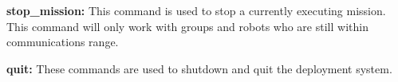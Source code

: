     \textbf{stop\_mission:}
      This command is used to stop a currently executing mission.
      This command will only work with groups and robots who are still within
        communications range.

    \textbf{quit:}
      These commands are used to shutdown and quit the deployment system.
 

%
%

